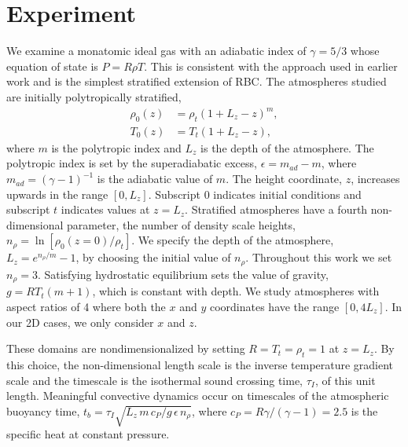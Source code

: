 \documentclass[aps, prfluids, onecolumn, notitlepage, nofootinbib, groupedaddress, amsfonts, amssymb, amsmath]{revtex4-1}
\begin{document}
\section{Experiment} 
\label{sec:experiment}
We examine a monatomic ideal gas with an adiabatic index of
$\gamma = 5/3$ whose equation of state is $P = R\rho T$. This is consistent with the approach used in earlier work 
\cite{graham1975, chan&all1982, brandenburg&all2005,
hurlburt&all1984, cattaneo&all1990, cattaneo&all1991, brummell&all1996} 
and is the simplest stratified extension of RBC.
The atmospheres studied are initially polytropically stratified,
\begin{equation}
\begin{split}
\rho_0(z) &= \rho_{t}(1 + L_z - z)^m, \\
T_0(z)    &= T_{t}(1 + L_z - z),
\label{eqn:polytrope}
\end{split}
\end{equation}
where $m$ is the polytropic index and $L_z$ is the depth of the atmosphere.
The polytropic
index is set by the superadiabatic excess, $\epsilon = m_{ad} - m$, where
$m_{ad} = (\gamma - 1)^{-1}$ is the adiabatic value of $m$.
The height coordinate, $z$, increases upwards in the range $[0, L_z]$.
Subscript 0 indicates initial conditions and subscript $t$ indicates values
at $z = L_z$.   Stratified atmospheres have a fourth non-dimensional parameter,
the number of density scale heights, $n_{\rho} = \ln\left[\rho_0(z=0)/\rho_t\right]$.  We
specify the depth of the atmosphere, $L_z = e^{n_{\rho}/m} - 1$, by choosing
the initial value of $n_{\rho}$.
Throughout this work we set $n_{\rho} = 3$.    Satisfying hydrostatic
equilibrium sets the value of gravity, $g = RT_t (m + 1)$, which is
constant with depth.  We study atmospheres with aspect
ratios of 4 where both the $x$ and $y$ coordinates have the range $[0, 4L_z]$.
In our 2D cases, we only consider $x$ and $z$.

These domains are nondimensionalized by setting
$R = T_t = \rho_t = 1$ at $z = L_z$.
By this choice, the non-dimensional
length scale is the inverse temperature gradient scale and the 
timescale is the isothermal sound crossing time, 
$\tau_I$, of this unit length.
Meaningful convective dynamics occur on 
timescales of the atmospheric buoyancy time,
$t_b = \tau_I \sqrt{L_z\,m\,c_P/g\,\epsilon\,n_\rho}$, where
$c_P = R \gamma/(\gamma-1) = 2.5$ is the specific heat at constant pressure.
\end{document}
